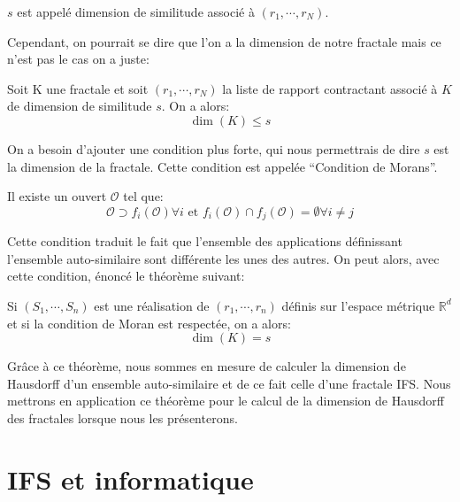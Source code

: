\documentclass[a4paper, 12pt]{report}
\begin{document}
			\begin{definition}
				$s$ est appelé dimension de similitude associé à $(r_1,\cdots,r_N)$.
			\end{definition}
			
			Cependant, on pourrait se dire que l'on a la dimension de notre fractale mais ce n'est pas le cas on a juste:
			\begin{remark*}
				Soit K une fractale et soit $(r_1,\cdots,r_N)$ la liste de rapport contractant associé à $K$ de dimension de similitude $s$. On a alors:
				\begin{equation*}
					\dim(K)\leq s
				\end{equation*}
			\end{remark*}
			
			On a besoin d'ajouter une condition plus forte, qui nous permettrais de dire $s$ est la dimension de la fractale. Cette condition est appelée ``Condition de Morans''.
			\begin{definition}
				Il existe un ouvert $\mathscr{O}$ tel que:
				\begin{equation}
					\mathscr{O}\supset f_i(\mathscr{O})\forall i \textrm{ et } f_i(\mathscr{O})\cap f_j(\mathscr{O})=\emptyset \forall i\neq j
				\end{equation}
			\end{definition}
			Cette condition traduit le fait que l'ensemble des applications définissant l'ensemble auto-similaire sont différente les unes des autres.
			On peut alors, avec cette condition, énoncé le théorème suivant:
			\begin{theorem}
				\label{thmDim}
				Si $(S_1,\cdots,S_n)$ est une réalisation de $(r_1,\cdots,r_n)$ définis sur l'espace métrique $\mathds{R}^d$ et si la condition de Moran est respectée, on a alors:
				\begin{equation*}
					\dim(K)=s
				\end{equation*}
			\end{theorem}
			\hspace{0.7 cm} Grâce à ce théorème, nous sommes en mesure de calculer la dimension de Hausdorff d'un ensemble auto-similaire et de ce fait celle d'une fractale IFS. Nous mettrons en application ce théorème pour le calcul de la dimension de Hausdorff des fractales lorsque nous les présenterons.
			

			
	
	\chapter{IFS et informatique}
			
\end{document}
